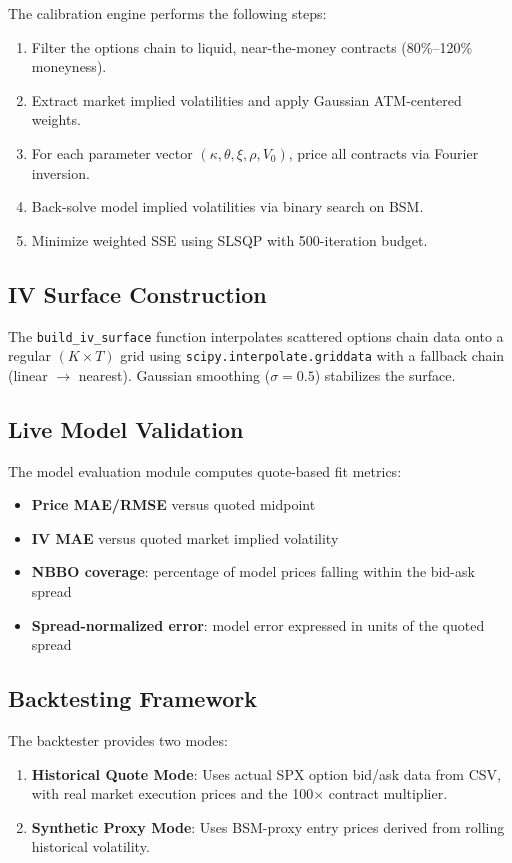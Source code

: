 \documentclass[12pt,a4paper]{article}
\begin{document}
The calibration engine performs the following steps:
\begin{enumerate}
\item Filter the options chain to liquid, near-the-money contracts (80\%--120\% moneyness).
\item Extract market implied volatilities and apply Gaussian ATM-centered weights.
\item For each parameter vector $(\kappa, \theta, \xi, \rho, V_0)$, price all contracts via Fourier inversion.
\item Back-solve model implied volatilities via binary search on BSM.
\item Minimize weighted SSE using SLSQP with 500-iteration budget.
\end{enumerate}

\subsection{IV Surface Construction}

The \texttt{build\_iv\_surface} function interpolates scattered options chain data onto a regular $(K \times T)$ grid using \texttt{scipy.interpolate.griddata} with a fallback chain (linear $\rightarrow$ nearest). Gaussian smoothing ($\sigma = 0.5$) stabilizes the surface.

\subsection{Live Model Validation}

The model evaluation module computes quote-based fit metrics:
\begin{itemize}
\item \textbf{Price MAE/RMSE} versus quoted midpoint
\item \textbf{IV MAE} versus quoted market implied volatility
\item \textbf{NBBO coverage}: percentage of model prices falling within the bid-ask spread
\item \textbf{Spread-normalized error}: model error expressed in units of the quoted spread
\end{itemize}

\subsection{Backtesting Framework}

The backtester provides two modes:
\begin{enumerate}
\item \textbf{Historical Quote Mode}: Uses actual SPX option bid/ask data from CSV, with real market execution prices and the 100$\times$ contract multiplier.
\item \textbf{Synthetic Proxy Mode}: Uses BSM-proxy entry prices derived from rolling historical volatility.
\end{enumerate}
\end{document}
